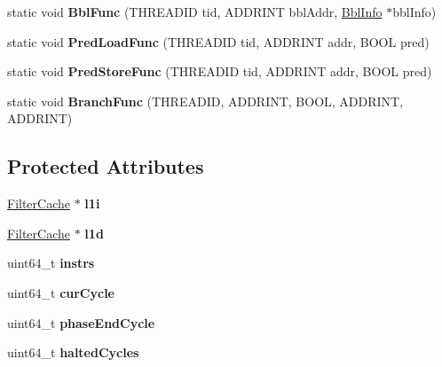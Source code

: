 \begin{DoxyCompactItemize}
\item 
\hypertarget{classSimpleCore_a218a5a9c229409b728524283cf4619e9}{static void {\bfseries Bbl\-Func} (T\-H\-R\-E\-A\-D\-I\-D tid, A\-D\-D\-R\-I\-N\-T bbl\-Addr, \hyperlink{structBblInfo}{Bbl\-Info} $\ast$bbl\-Info)}\label{classSimpleCore_a218a5a9c229409b728524283cf4619e9}

\item 
\hypertarget{classSimpleCore_abb7aa6c718688b2bf3c9e8104ba85f53}{static void {\bfseries Pred\-Load\-Func} (T\-H\-R\-E\-A\-D\-I\-D tid, A\-D\-D\-R\-I\-N\-T addr, B\-O\-O\-L pred)}\label{classSimpleCore_abb7aa6c718688b2bf3c9e8104ba85f53}

\item 
\hypertarget{classSimpleCore_a5a8ee407748f1cf5520b5a62ecbf63e5}{static void {\bfseries Pred\-Store\-Func} (T\-H\-R\-E\-A\-D\-I\-D tid, A\-D\-D\-R\-I\-N\-T addr, B\-O\-O\-L pred)}\label{classSimpleCore_a5a8ee407748f1cf5520b5a62ecbf63e5}

\item 
\hypertarget{classSimpleCore_a7a785c0ea70ef0025917906017f2d995}{static void {\bfseries Branch\-Func} (T\-H\-R\-E\-A\-D\-I\-D, A\-D\-D\-R\-I\-N\-T, B\-O\-O\-L, A\-D\-D\-R\-I\-N\-T, A\-D\-D\-R\-I\-N\-T)}\label{classSimpleCore_a7a785c0ea70ef0025917906017f2d995}

\end{DoxyCompactItemize}
\subsection*{Protected Attributes}
\begin{DoxyCompactItemize}
\item 
\hypertarget{classSimpleCore_ac51dfd55f79f0ef8913372fb5b9f232a}{\hyperlink{classFilterCache}{Filter\-Cache} $\ast$ {\bfseries l1i}}\label{classSimpleCore_ac51dfd55f79f0ef8913372fb5b9f232a}

\item 
\hypertarget{classSimpleCore_ad254cf29b5b9c5e4ef8dd428e99cf13a}{\hyperlink{classFilterCache}{Filter\-Cache} $\ast$ {\bfseries l1d}}\label{classSimpleCore_ad254cf29b5b9c5e4ef8dd428e99cf13a}

\item 
\hypertarget{classSimpleCore_adb9609524f5eedf1ef63dc5420fe613f}{uint64\-\_\-t {\bfseries instrs}}\label{classSimpleCore_adb9609524f5eedf1ef63dc5420fe613f}

\item 
\hypertarget{classSimpleCore_a8078954e1440f896cb39566b9c30fedd}{uint64\-\_\-t {\bfseries cur\-Cycle}}\label{classSimpleCore_a8078954e1440f896cb39566b9c30fedd}

\item 
\hypertarget{classSimpleCore_a46ba37fa733c651a7f3f4ea5e1b924dd}{uint64\-\_\-t {\bfseries phase\-End\-Cycle}}\label{classSimpleCore_a46ba37fa733c651a7f3f4ea5e1b924dd}

\item 
\hypertarget{classSimpleCore_a8f3b8dc1eeb02af3d2eb322a242a97de}{uint64\-\_\-t {\bfseries halted\-Cycles}}\label{classSimpleCore_a8f3b8dc1eeb02af3d2eb322a242a97de}

\end{DoxyCompactItemize}


